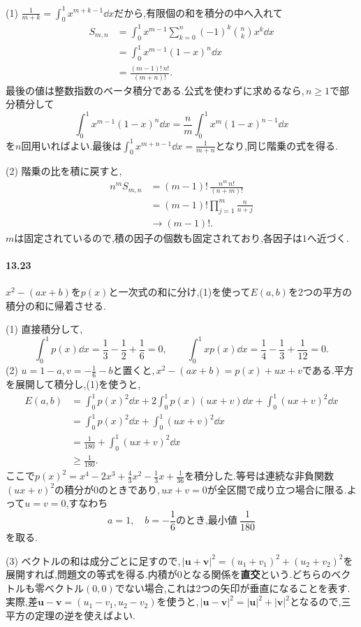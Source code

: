 (1) $\frac1{m+k}=\int_0^1x^{m+k-1}\dd x$だから,有限個の和を積分の中へ入れて
\[
 \begin{aligned}
 S_{m,n}
 &=\int_0^1x^{m-1}\sum_{k=0}^n(-1)^k\binom nk x^k\dd x\\
 &=\int_0^1x^{m-1}(1-x)^n\dd x\\
 &=\boxed{\frac{(m-1)!\,n!}{(m+n)!}}.
 \end{aligned}
\]
最後の値は整数指数のベータ積分である.公式を使わずに求めるなら,\,$n\ge1$で部分積分して
\[
 \int_0^1x^{m-1}(1-x)^n\dd x
 =\frac nm\int_0^1x^m(1-x)^{n-1}\dd x
\]
を$n$回用いればよい.最後は$\int_0^1x^{m+n-1}\dd x=\frac1{m+n}$となり,同じ階乗の式を得る.

(2) 階乗の比を積に戻すと,
\[
 \begin{aligned}
 n^m S_{m,n}
 &=(m-1)!\,\frac{n^m\,n!}{(n+m)!}\\
 &=(m-1)!\prod_{j=1}^m\frac{n}{n+j}\\
 &\longrightarrow\boxed{(m-1)!}.
 \end{aligned}
\]
$m$は固定されているので,積の因子の個数も固定されており,各因子は$1$へ近づく.

\paragraph{13.23}
$x^2-(ax+b)$を$p(x)$と一次式の和に分け,(1)を使って$E(a,b)$を2つの平方の積分の和に帰着させる.

(1) 直接積分して,
\[
 \int_0^1p(x)\dd x=\frac13-\frac12+\frac16=0,
 \qquad
 \int_0^1xp(x)\dd x=\frac14-\frac13+\frac1{12}=0.
\]
(2) $u=1-a$,\,$v=-\frac16-b$と置くと,\,$x^2-(ax+b)=p(x)+ux+v$である.平方を展開して積分し,(1)を使うと,
\[
 \begin{aligned}
 E(a,b)&=\int_0^1p(x)^2\dd x+2\int_0^1p(x)(ux+v)\dd x+\int_0^1(ux+v)^2\dd x\\
 &=\int_0^1p(x)^2\dd x+\int_0^1(ux+v)^2\dd x\\
 &=\frac1{180}+\int_0^1(ux+v)^2\dd x\\
 &\ge\frac1{180}.
 \end{aligned}
\]
ここで$p(x)^2=x^4-2x^3+\frac43x^2-\frac13x+\frac1{36}$を積分した.等号は連続な非負関数$(ux+v)^2$の積分が$0$のときであり,\,$ux+v=0$が全区間で成り立つ場合に限る.よって$u=v=0$,すなわち
\[
 \boxed{a=1,\quad b=-\frac16\text{のとき,最小値}\ \frac1{180}}
\]
を取る.

(3) ベクトルの和は成分ごとに足すので,\,$|\boldsymbol u+\boldsymbol v|^2=(u_1+v_1)^2+(u_2+v_2)^2$を展開すれば,問題文の等式を得る.内積が$0$となる関係を\textbf{直交}という.どちらのベクトルも零ベクトル$(0,0)$でない場合,これは2つの矢印が垂直になることを表す.実際,差$\boldsymbol u-\boldsymbol v=(u_1-v_1,u_2-v_2)$を使うと,\,$|\boldsymbol u-\boldsymbol v|^2=|\boldsymbol u|^2+|\boldsymbol v|^2$となるので,三平方の定理の逆を使えばよい.

